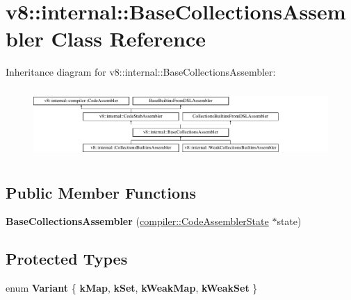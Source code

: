 \hypertarget{classv8_1_1internal_1_1BaseCollectionsAssembler}{}\section{v8\+:\+:internal\+:\+:Base\+Collections\+Assembler Class Reference}
\label{classv8_1_1internal_1_1BaseCollectionsAssembler}
Inheritance diagram for v8\+:\+:internal\+:\+:Base\+Collections\+Assembler\+:\begin{figure}[H]
\begin{center}
\leavevmode
\includegraphics[height=2.666667cm]{classv8_1_1internal_1_1BaseCollectionsAssembler}
\end{center}
\end{figure}
\subsection*{Public Member Functions}
\begin{DoxyCompactItemize}
\item 
\mbox{\label{classv8_1_1internal_1_1BaseCollectionsAssembler_aa6233af936515d2fcb11f0f2e20642af}} 
{\bfseries Base\+Collections\+Assembler} (\mbox{\hyperlink{classv8_1_1internal_1_1compiler_1_1CodeAssemblerState}{compiler\+::\+Code\+Assembler\+State}} $\ast$state)
\end{DoxyCompactItemize}
\subsection*{Protected Types}
\begin{DoxyCompactItemize}
\item 
\mbox{\label{classv8_1_1internal_1_1BaseCollectionsAssembler_a015331a50bbfaff45b9a75af0791ec02}} 
enum {\bfseries Variant} \{ {\bfseries k\+Map}, 
{\bfseries k\+Set}, 
{\bfseries k\+Weak\+Map}, 
{\bfseries k\+Weak\+Set}
 \}
\end{DoxyCompactItemize}
